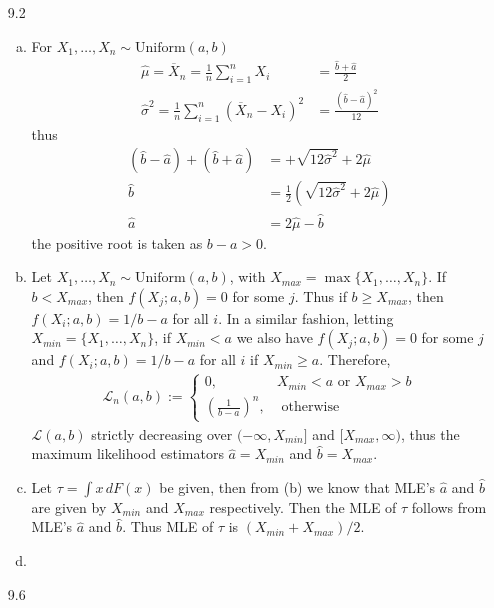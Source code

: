 \documentclass[a4paper,10pt]{article}
\theoremstyle{definition}
\begin{document}
\begin{enumerate}
\item[9.2]
\begin{enumerate}[(a)]
\item For $X_1,\ldots, X_n \sim \text{Uniform}(a,b)$
\begin{align*}
\hat{\mu}=\overline{X}_n=\frac{1}{n}\sum_{i=1}^{n}X_i&=\frac{\hat{b}+\hat{a}}{2}\\
\hat{\sigma}^2=\frac{1}{n}\sum_{i=1}^{n}(\overline{X}_n-X_i)^2&=\frac{(\hat{b}-\hat{a})^2}{12}
\end{align*}
thus
\begin{align*}
(\hat{b}-\hat{a})+(\hat{b}+\hat{a}) &= +\sqrt{12\hat{\sigma}^2}+2\hat{\mu}\\
\hat{b} &= \frac{1}{2}\left(\sqrt{12\hat{\sigma}^2}+2\hat{\mu}\right)\\
\hat{a} &=2\hat{\mu}-\hat{b }
\end{align*}
the positive root is taken as $b-a>0$.
\item Let $X_1,\ldots, X_n \sim \text{Uniform}(a,b)$, with $X_{max}=\max \{X_1,\ldots, X_n\}$. If $b < X_{max}$, then $f(X_j;a,b)=0$ for some $j$. Thus if $b \geq X_{max}$, then $f(X_i;a,b)=1/b-a$ for all $i$. In a similar fashion, letting $X_{min} = \{X_1,\ldots, X_n\}$, if $X_{min}<a$ we also have $f(X_j;a,b)=0$ for some $j$ and $f(X_i;a,b)=1/b-a$ for all $i$ if $X_{min} \geq a$. Therefore,
\begin{align*}
\mathcal{L}_n(a,b):=\begin{cases}
0, & X_{min} < a \text{ or }X_{max} >  b \\
\left(\frac{1}{b-a}\right)^n, & \text{ otherwise }%
\end{cases}
\end{align*}
$\mathcal{L}(a,b)$ strictly decreasing over $(-\infty,X_{min}]$ and $[X_{max},\infty)$, thus the maximum likelihood estimators $\hat{a}=X_{min}$ and $\hat{b}=X_{max}$.

\item Let $\tau = \int x \,dF(x)$ be given, then from (b) we know that {\sffamily MLE}'s $\hat{a}$ and $\hat{b}$ are given by $X_{min}$ and $X_{max}$ respectively. Then the {\sffamily MLE} of $\tau$ follows from {\sffamily MLE}'s $\hat{a}$ and $\hat{b}$. Thus {\sffamily MLE} of $\tau$ is $(X_{min} + X_{max})/2$. 
\item
\end{enumerate}
\item[9.6] 

\end{enumerate}
\end{document}
